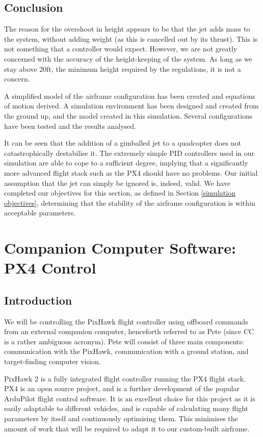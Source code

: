 \documentclass[11pt]{article}
\begin{document}
\subsection{Conclusion}
The reason for the overshoot in height appears to be that the jet adds mass to the system, without adding weight (as this is cancelled out by its thrust). This is not something that a controller would expect. However, we are not greatly concerned with the accuracy of the height-keeping of the system. As long as we stay above 20ft, the minimum height required by the regulations\cite{IMechE_rules}, it is not a concern.

A simplified model of the airframe configuration has been created and equations of motion derived. A simulation environment has been designed and created from the ground up, and the model created in this simulation. Several configurations have been tested and the results analysed.

It can be seen that the addition of a gimballed jet to a quadcopter does not catastrophically destabilise it. The extremely simple PID controllers used in our simulation are able to cope to a sufficient degree, implying that a significantly more advanced flight stack such as the PX4 should have no problems. Our initial assumption that the jet can simply be ignored is, indeed, valid. We have completed our objectives for this section, as defined in Section \ref{simulation objectives}, determining that the stability of the airframe configuration is within acceptable parameters.



\section{Companion Computer Software: PX4 Control}
\subsection{Introduction}\label{PX4 Control}
We will be controlling the PixHawk flight controller using offboard commands from an external companion computer, henceforth referred to as Pete (since CC is a rather ambiguous acronym). Pete will consist of three main components: communication with the PixHawk, communication with a ground station, and target-finding computer vision.

PixHawk 2 is a fully integrated flight controller running the PX4 flight stack. PX4 is an open source project, and is a further development of the popular ArduPilot flight control software. It is an excellent choice for this project as it is easily adaptable to different vehicles, and is capable of calculating many flight parameters by itself and continuously optimising them. This minimises the amount of work that will be required to adapt it to our custom-built airframe.
\end{document}
